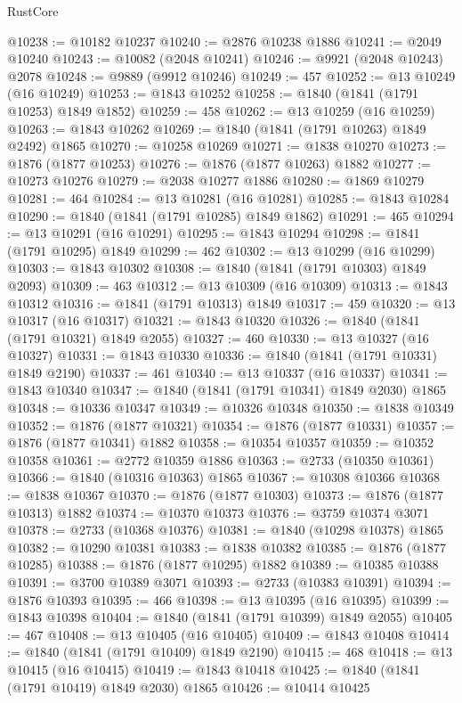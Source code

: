 \begin{lexlean}{RustCore}
\begin{coremodule}
@10238 := @10182 @10237
@10240 := @2876 @10238 @1886
@10241 := @2049 @10240
@10243 := @10082 (@2048 @10241)
@10246 := @9921 (@2048 @10243) @2078
@10248 := @9889 (@9912 @10246)
@10249 := 457
@10252 := @13 @10249 (@16 @10249)
@10253 := @1843 @10252
@10258 := @1840 (@1841 (@1791 @10253) @1849 @1852)
@10259 := 458
@10262 := @13 @10259 (@16 @10259)
@10263 := @1843 @10262
@10269 := @1840 (@1841 (@1791 @10263) @1849 @2492) @1865
@10270 := @10258 @10269
@10271 := @1838 @10270
@10273 := @1876 (@1877 @10253)
@10276 := @1876 (@1877 @10263) @1882
@10277 := @10273 @10276
@10279 := @2038 @10277 @1886
@10280 := @1869 @10279
@10281 := 464
@10284 := @13 @10281 (@16 @10281)
@10285 := @1843 @10284
@10290 := @1840 (@1841 (@1791 @10285) @1849 @1862)
@10291 := 465
@10294 := @13 @10291 (@16 @10291)
@10295 := @1843 @10294
@10298 := @1841 (@1791 @10295) @1849
@10299 := 462
@10302 := @13 @10299 (@16 @10299)
@10303 := @1843 @10302
@10308 := @1840 (@1841 (@1791 @10303) @1849 @2093)
@10309 := 463
@10312 := @13 @10309 (@16 @10309)
@10313 := @1843 @10312
@10316 := @1841 (@1791 @10313) @1849
@10317 := 459
@10320 := @13 @10317 (@16 @10317)
@10321 := @1843 @10320
@10326 := @1840 (@1841 (@1791 @10321) @1849 @2055)
@10327 := 460
@10330 := @13 @10327 (@16 @10327)
@10331 := @1843 @10330
@10336 := @1840 (@1841 (@1791 @10331) @1849 @2190)
@10337 := 461
@10340 := @13 @10337 (@16 @10337)
@10341 := @1843 @10340
@10347 := @1840 (@1841 (@1791 @10341) @1849 @2030) @1865
@10348 := @10336 @10347
@10349 := @10326 @10348
@10350 := @1838 @10349
@10352 := @1876 (@1877 @10321)
@10354 := @1876 (@1877 @10331)
@10357 := @1876 (@1877 @10341) @1882
@10358 := @10354 @10357
@10359 := @10352 @10358
@10361 := @2772 @10359 @1886
@10363 := @2733 (@10350 @10361)
@10366 := @1840 (@10316 @10363) @1865
@10367 := @10308 @10366
@10368 := @1838 @10367
@10370 := @1876 (@1877 @10303)
@10373 := @1876 (@1877 @10313) @1882
@10374 := @10370 @10373
@10376 := @3759 @10374 @3071
@10378 := @2733 (@10368 @10376)
@10381 := @1840 (@10298 @10378) @1865
@10382 := @10290 @10381
@10383 := @1838 @10382
@10385 := @1876 (@1877 @10285)
@10388 := @1876 (@1877 @10295) @1882
@10389 := @10385 @10388
@10391 := @3700 @10389 @3071
@10393 := @2733 (@10383 @10391)
@10394 := @1876 @10393
@10395 := 466
@10398 := @13 @10395 (@16 @10395)
@10399 := @1843 @10398
@10404 := @1840 (@1841 (@1791 @10399) @1849 @2055)
@10405 := 467
@10408 := @13 @10405 (@16 @10405)
@10409 := @1843 @10408
@10414 := @1840 (@1841 (@1791 @10409) @1849 @2190)
@10415 := 468
@10418 := @13 @10415 (@16 @10415)
@10419 := @1843 @10418
@10425 := @1840 (@1841 (@1791 @10419) @1849 @2030) @1865
@10426 := @10414 @10425

\end{coremodule}
\end{lexlean}
